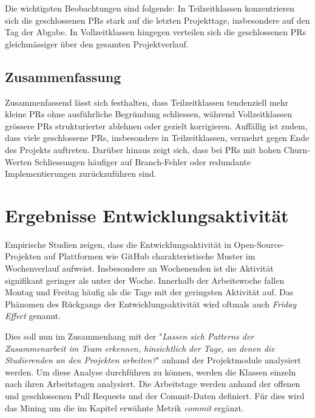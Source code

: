 Die wichtigsten Beobachtungen sind folgende: In Teilzeitklassen konzentrieren sich die geschlossenen PRs stark auf die letzten Projekttage, insbesondere auf den Tag der Abgabe. In Vollzeitklassen hingegen verteilen sich die geschlossenen PRs gleichmässiger über den gesamten Projektverlauf.


\subsection{Zusammenfassung}

Zusammenfassend lässt sich festhalten, dass Teilzeitklassen tendenziell mehr kleine PRs ohne ausführliche Begründung schliessen, während Vollzeitklassen grössere PRs strukturierter ablehnen oder gezielt korrigieren. Auffällig ist zudem, dass viele geschlossene PRs, insbesondere in Teilzeitklassen, vermehrt gegen Ende des Projekts auftreten. Darüber hinaus zeigt sich, dass bei PRs mit hohen Churn-Werten Schliessungen häufiger auf Branch-Fehler oder redundante Implementierungen zurückzuführen sind.


\section{Ergebnisse Entwicklungsaktivität}
Empirische Studien zeigen, dass die Entwicklungsaktivität in Open-Source-Projekten auf Plattformen wie GitHub charakteristische Muster im Wochenverlauf aufweist. Insbesondere an Wochenenden ist die Aktivität signifikant geringer als unter der Woche. Innerhalb der Arbeitswoche fallen Montag und Freitag häufig als die Tage mit der geringsten Aktivität auf. Das Phänomen des Rückgangs der Entwicklungsaktivität wird oftmals auch \textit{Friday Effect} genannt. \parencite{claes_programmers_2018}

Dies soll nun im Zusammenhang mit der  "\textit{Lassen sich Patterns der Zusammenarbeit im Team erkennen,
hinsichtlich der Tage, an denen die Studierenden an den Projekten arbeiten?}" anhand der Projektmodule analysiert werden. Um diese Analyse durchführen zu können, werden die Klassen einzeln nach ihren Arbeitstagen analysiert. Die Arbeitstage werden anhand der offenen und geschlossenen Pull Requests und der Commit-Daten definiert. Für dies wird das Mining um die im Kapitel  erwähnte Metrik \textit{commit} ergänzt.

